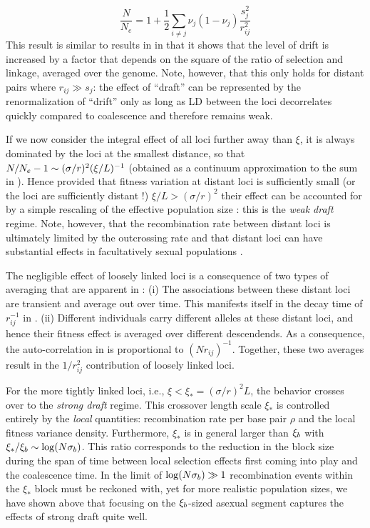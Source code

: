 \begin{equation}
  \label{eq:Ne}
  \frac{N}{N_e} = 1+\frac{1}{2}\sum_{i\neq j} \nu_j(1-\nu_j)\frac{s_j^2}{r_{ij}^2}
\end{equation}
This result is similar to results in
\cite{Nordborg:1996p18149,Hudson:1995p18197,Santiago:1998p34629,Robertson:1961p36142}
in that it shows that the level of drift is increased by a factor that
depends on the square of the ratio of selection and linkage, averaged
over the genome. Note, however, that this only holds for distant pairs
where $r_{ij}\gg s_j$: the effect of ``draft'' can be represented by the
renormalization of ``drift'' only as long as LD between the loci decorrelates quickly
compared to coalescence and therefore remains weak.

If we now consider the integral effect of all loci further away than
$\xi$, it is always dominated by the loci at the smallest distance, so
that $N/N_e -1 \sim ( \sigma / r )^2 ( \xi / L)^{-1} $ (obtained as
a continuum approximation to the sum in ). Hence
provided that fitness variation at distant loci is sufficiently small
(or the loci are sufficiently distant !) $\xi/L > ( \sigma / r)^2 $
their effect can be accounted for by a simple rescaling of the effective
population size \cite{weissman_limits_2012}: this is the {\it weak
  draft} regime. Note, however, that the recombination rate between
distant loci is ultimately limited by the outcrossing rate and that
distant loci can have substantial effects in facultatively sexual
populations \cite{Neher:2010p30641,weissman_limits_2012}.

The negligible effect of loosely linked loci is a consequence of two
types of averaging that are apparent in : (i) The 
associations between these distant loci are transient and average out
over time. This manifests itself in the decay time of $r_{ij}^{-1}$ in
. (ii) Different individuals carry different alleles at
these distant loci, and hence their fitness effect is averaged over
different descendends. As a consequence, the auto-correlation in  is
proportional to $(Nr_{ij})^{-1}$. Together, these two averages result
in the $1/r_{ij}^2$ contribution of loosely linked loci.

For the more tightly linked loci, i.e., $\xi <  \xi_*=( \sigma / r)^2 L
$, the behavior crosses over
to the {\it strong draft} regime. This crossover length scale $\xi_*$ is 
controlled entirely by the {\it local}
quantities: recombination rate per base pair $\rho$ and the local
fitness variance density. Furthermore, $\xi_*$ is in general larger than
${\xi_b}$ with 
$\xi_*/{\xi_b} \sim \log (N {\sigma_b} )$. This ratio corresponds to the
reduction in the block size during the span of time between local
selection effects first coming into play and the coalescence time. In
the limit of $\log (N {\sigma_b} ) \gg 1$ recombination events within
the $\xi_*$ block must be reckoned with, yet for more realistic population sizes,
we have shown above that focusing on the ${\xi_b}$-sized asexual segment
captures the effects of strong draft quite well.


